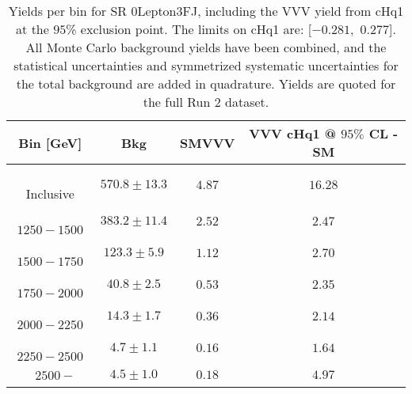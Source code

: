 \begin{table}[!htbp]
    \small
    \center
    \begin{tabular}{c||c|c|c}
    Bin [GeV] & Bkg & SMVVV & \pbox{20cm}{VVV \\ cHq1 @ $95\%$ CL - SM \\ }\\
    \hline
    \pbox{20cm}{ ~ \\Inclusive\\ } & $570.8 \pm 13.3$ & $4.87$ & $16.28$\\
    \hline
    \pbox{20cm}{ ~ \\$1250-1500$\\ } & $383.2 \pm 11.4$ & $2.52$ & $2.47$\\
    \hline
    \pbox{20cm}{ ~ \\$1500-1750$\\ } & $123.3 \pm 5.9$ & $1.12$ & $2.70$\\
    \hline
    \pbox{20cm}{ ~ \\$1750-2000$\\ } & $40.8 \pm 2.5$ & $0.53$ & $2.35$\\
    \hline
    \pbox{20cm}{ ~ \\$2000-2250$\\ } & $14.3 \pm 1.7$ & $0.36$ & $2.14$\\
    \hline
    \pbox{20cm}{ ~ \\$2250-2500$\\ } & $4.7 \pm 1.1$ & $0.16$ & $1.64$\\
    \hline
    \pbox{20cm}{ ~ \\$2500-$\\ } & $4.5 \pm 1.0$ & $0.18$ & $4.97$\\
\end{tabular}
    \caption{Yields per bin for SR 0Lepton3FJ, including the VVV yield from cHq1 at the $95$\% exclusion point. The limits on cHq1 are: [$-0.281$,~$0.277$]. All Monte Carlo background yields have been combined, and the statistical uncertainties and symmetrized systematic uncertainties for the total background are added in quadrature. Yields are quoted for the full Run 2 dataset.}
    \label{tab:0Lepton3FJ$binssignal}
\end{table}
